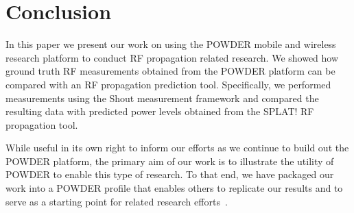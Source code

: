 

\section{Conclusion}

In this paper we present our work on using the POWDER mobile and wireless
research platform to conduct RF propagation related research. We showed
how ground truth RF measurements obtained from the POWDER platform can
be compared with an RF propagation prediction tool. 
Specifically, we performed measurements using the Shout measurement framework
and compared the resulting data with predicted power levels obtained from the
SPLAT! RF propagation tool. 

While useful in its own right to inform our efforts as we continue 
to build out the POWDER platform, the primary aim of our work is to
illustrate the utility of POWDER to enable this type of research. To that end,
we have packaged our work into a POWDER profile that enables others to
replicate our results and to serve as a starting point for related research
efforts~\cite{paper_profile}. 

\iffalse
In this paper we discussed RF propagation. Specifically, we covered RF propagation models, ran a few measurements on the 
POWDER platform, discussed our results, and compared the data between our propagation model and the ``ground truth". 
SPLAT! was our RF propagation model of choice and its measurement results were compared with the Shout framework. Shout 
was developed by the POWDER team to conduct measurement studies on the POWDER platform. 

Our results showed that SPLAT! on the 3561 MHz and 2620 MHz frequencies overpredicted the path loss, however on the 3550 
MHz and 3690 MHz SPLAT! under-predicted the path loss with respect to the Shout framework. Furthermore, on the 3561 MHz
frequency, Shout and SPLAT! both picked the same two nodes with the best RF propagation, but failed to choose the same two 
nodes when it came to picking nodes with the worst RF propagation. There is no definitive answer as to whether or not Shout 
has been validated with respect to SPLAT!. RF propagation models take into account multiple parameters to calculate path loss,
it could just so be that SPLAT! is not the ideal model for the POWDER platform.
\fi
